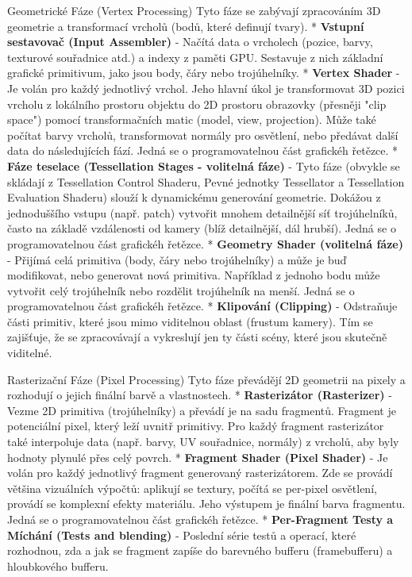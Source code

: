 \secc Geometrické Fáze (Vertex Processing) 
Tyto fáze se zabývají zpracováním 3D geometrie a transformací vrcholů (bodů, které definují tvary). 
\begitems
* {\bf Vstupní sestavovač (Input Assembler)} - Načítá data o vrcholech (pozice, barvy, texturové souřadnice atd.) a indexy z paměti GPU. Sestavuje z nich základní grafické primitivum, jako jsou body, čáry nebo trojúhelníky.
* {\bf Vertex Shader} - Je volán pro každý jednotlivý vrchol. Jeho hlavní úkol je transformovat 3D pozici vrcholu z lokálního prostoru objektu do 2D prostoru obrazovky (přesněji "clip space") pomocí transformačních matic (model, view, projection). Může také počítat barvy vrcholů, transformovat normály pro osvětlení, nebo předávat další data do následujících fází. Jedná se o programovatelnou část grafickéh řetězce.
* {\bf Fáze teselace (Tessellation Stages - volitelná fáze)} - Tyto fáze (obvykle se skládají z Tessellation Control Shaderu, Pevné jednotky Tessellator a Tessellation Evaluation Shaderu) slouží k dynamickému generování geometrie. Dokážou z jednoduššího vstupu (např. patch) vytvořit mnohem detailnější síť trojúhelníků, často na základě vzdálenosti od kamery (blíž detailnější, dál hrubší). Jedná se o programovatelnou část grafickéh řetězce.
* {\bf Geometry Shader (volitelná fáze)} - Přijímá celá primitiva (body, čáry nebo trojúhelníky) a může je buď modifikovat, nebo generovat nová primitiva. Například z jednoho bodu může vytvořit celý trojúhelník nebo rozdělit trojúhelník na menší. Jedná se o programovatelnou část grafickéh řetězce.
* {\bf Klipování (Clipping)} - Odstraňuje části primitiv, které jsou mimo viditelnou oblast (frustum kamery). Tím se zajišťuje, že se zpracovávají a vykreslují jen ty části scény, které jsou skutečně viditelné.
\enditems

\secc Rasterizační Fáze (Pixel Processing)
Tyto fáze převádějí 2D geometrii na pixely a rozhodují o jejich finální barvě a vlastnostech.
\begitems
* {\bf Rasterizátor (Rasterizer)} - Vezme 2D primitiva (trojúhelníky) a převádí je na sadu fragmentů. Fragment je potenciální pixel, který leží uvnitř primitivy. Pro každý fragment rasterizátor také interpoluje data (např. barvy, UV souřadnice, normály) z vrcholů, aby byly hodnoty plynulé přes celý povrch.
* {\bf Fragment Shader (Pixel Shader)} - Je volán pro každý jednotlivý fragment generovaný rasterizátorem. Zde se provádí většina vizuálních výpočtů: aplikují se textury, počítá se per-pixel osvětlení, provádí se komplexní efekty materiálu. Jeho výstupem je finální barva fragmentu. Jedná se o programovatelnou část grafickéh řetězce.
* {\bf Per-Fragment Testy a Míchání (Tests and blending)} - Poslední série testů a operací, které rozhodnou, zda a jak se fragment zapíše do barevného bufferu (framebufferu) a hloubkového bufferu.
\enditems


